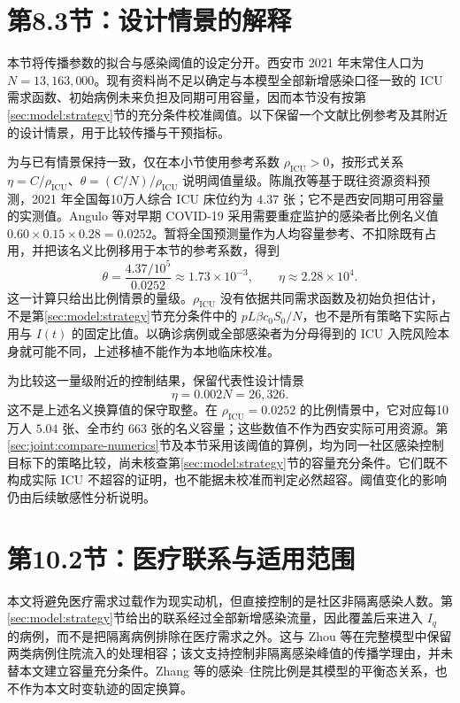 \documentclass[UTF8,a4paper,zihao=-4,fontset=fandol]{ctexart}
\theoremstyle{remark}
\begin{document}
\section*{第8.3节：设计情景的解释}
本节将传播参数的拟合与感染阈值的设定分开。西安市 2021 年末常住人口为 $N=13{,}163{,}000$\cite{XianStat2021}。现有资料尚不足以确定与本模型全部新增感染口径一致的 ICU 需求函数、初始病例未来负担及同期可用容量，因而本节没有按第\ref{sec:model:strategy}节的充分条件校准阈值。以下保留一个文献比例参考及其附近的设计情景，用于比较传播与干预指标。

为与已有情景保持一致，仅在本小节使用参考系数 $\rho_{\mathrm{ICU}}>0$，按形式关系 $\eta=C/\rho_{\mathrm{ICU}}$、$\theta=(C/N)/\rho_{\mathrm{ICU}}$ 说明阈值量级。陈胤孜等\cite{Chen2021ICUForecast}基于既往资源资料预测，2021 年全国每10万人综合 ICU 床位约为 $4.37$ 张；它不是西安同期可用容量的实测值。Angulo 等\cite[补充材料 S4.1]{Angulo2021}对早期 COVID-19 采用需要重症监护的感染者比例名义值 $0.60\times0.15\times0.28=0.0252$。暂将全国预测量作为人均容量参考、不扣除既有占用，并把该名义比例移用于本节的参考系数，得到
\[
\theta=\frac{4.37/10^5}{0.0252}\approx1.73\times10^{-3},
\qquad \eta\approx2.28\times10^4.
\]
这一计算只给出比例情景的量级。$\rho_{\mathrm{ICU}}$ 没有依据共同需求函数及初始负担估计，不是第\ref{sec:model:strategy}节充分条件中的 $pL\beta c_0S_0/N$，也不是所有策略下实际占用与 $I(t)$ 的固定比值。以确诊病例或全部感染者为分母得到的 ICU 入院风险本身就可能不同\cite{Pung2023Undetected}，上述移植不能作为本地临床校准。

为比较这一量级附近的控制结果，保留代表性设计情景
\begin{equation}
\eta=0.002N=26{,}326.
\end{equation}
这不是上述名义换算值的保守取整。在 $\rho_{\mathrm{ICU}}=0.0252$ 的比例情景中，它对应每10万人 $5.04$ 张、全市约 $663$ 张的名义容量；这些数值不作为西安实际可用资源。第\ref{sec:joint:compare-numerics}节及本节采用该阈值的算例，均为同一社区感染控制目标下的策略比较，尚未核查第\ref{sec:model:strategy}节的容量充分条件。它们既不构成实际 ICU 不超容的证明，也不能据未校准而判定必然超容。阈值变化的影响仍由后续敏感性分析说明。
\clearpage
\section*{第10.2节：医疗联系与适用范围}
本文将避免医疗需求过载作为现实动机，但直接控制的是社区非隔离感染人数。第\ref{sec:model:strategy}节给出的联系经过全部新增感染流量，因此覆盖后来进入 $I_q$ 的病例，而不是把隔离病例排除在医疗需求之外。这与 Zhou 等\cite{Zhou2024SPCI}在完整模型中保留两类病例住院流入的处理相容；该文支持控制非隔离感染峰值的传播学理由，并未替本文建立容量充分条件。Zhang 等\cite[注记1]{Zhang2026Behavior}的感染--住院比例是其模型的平衡态关系，也不作为本文时变轨迹的固定换算。
\end{document}
